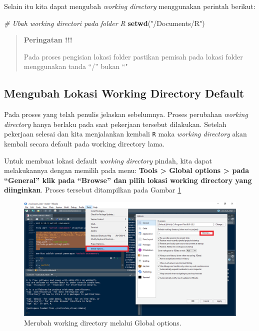 \documentclass[
]{book}
\newenvironment{Shaded}{\begin{snugshade}}{\end{snugshade}}
\newcommand{\CommentTok}[1]{\textcolor[rgb]{0.56,0.35,0.01}{\textit{#1}}}
\newcommand{\FunctionTok}[1]{\textcolor[rgb]{0.13,0.29,0.53}{\textbf{#1}}}
\newcommand{\NormalTok}[1]{#1}
\newcommand{\StringTok}[1]{\textcolor[rgb]{0.31,0.60,0.02}{#1}}
\theoremstyle{definition}
\theoremstyle{definition}
\theoremstyle{definition}
\theoremstyle{definition}
\theoremstyle{remark}
\begin{document}
Selain itu kita dapat mengubah \emph{working directory} menggunakan perintah berikut:

\begin{Shaded}
\begin{Highlighting}[]
\CommentTok{\# Ubah working directori pada folder R}
\FunctionTok{setwd}\NormalTok{(}\StringTok{"/Documents/R"}\NormalTok{)}
\end{Highlighting}
\end{Shaded}

\begin{quote}
\textbf{Peringatan !!!}

Pada proses pengisian lokasi folder pastikan pemisah pada lokasi folder menggunakan tanda ``/'' bukan ``"
\end{quote}

\hypertarget{defaultwdR}{%
\subsection{Mengubah Lokasi Working Directory Default}\label{defaultwdR}}

Pada proses yang telah penulis jelaskan sebelumnya. Proses perubahan \emph{working directory} hanya berlaku pada saat pekerjaan tersebut dilakukan. Setelah pekerjaan selesai dan kita menjalankan kembali \texttt{R} maka \emph{working directory} akan kembali secara default pada working directory lama.

Untuk membuat lokasi default \emph{working directory} pindah, kita dapat melakukannya dengan memilih pada menu: \textbf{Tools \textgreater{} Global options \textgreater{} pada ``General'' klik pada ``Browse'' dan pilih lokasi working directory yang diinginkan}. Proses tersebut ditampilkan pada Gambar \ref{fig:default}

\begin{figure}

{\centering \includegraphics[width=0.8\linewidth]{./images/default} 

}

\caption{Merubah working directory melalui Global options.}\label{fig:default}
\end{figure}
\end{document}
